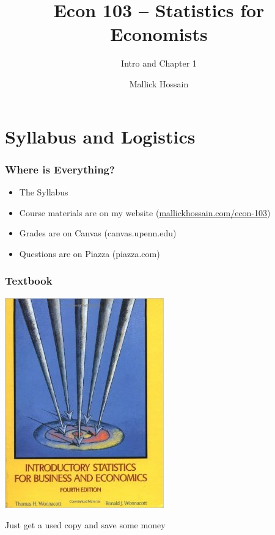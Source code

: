 \documentclass{beamer}
\title{Econ 103 -- Statistics for Economists}
\subtitle{Intro and Chapter 1}
\author{Mallick Hossain}
\date{}
\institute{University of Pennsylvania}
\begin{document}
 

\begin{frame}
	\titlepage 
\end{frame} 

\section{Syllabus and Logistics}
\begin{frame}
\frametitle{Where is Everything?}
	\begin{itemize}[<+- | alert@+>]
		\item  The Syllabus
		\item Course materials are on my website (\url{mallickhossain.com/econ-103})
		\item Grades are on Canvas (canvas.upenn.edu)
		\item Questions are on Piazza (piazza.com)
	\end{itemize}
\end{frame}

\begin{frame}
\frametitle{Textbook}
	\begin{center}
		\includegraphics[scale=0.5]{./images/textbook.jpeg}
	\end{center}
	\centering
	Just get a used copy and save some money
\end{frame}
\end{document}
